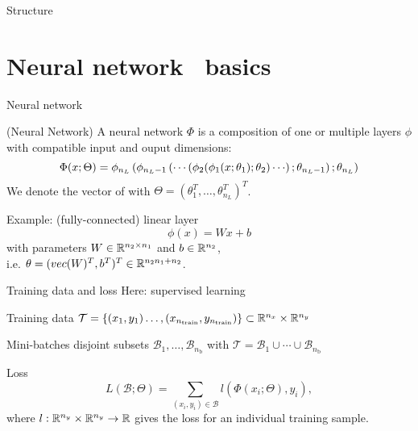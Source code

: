 \begin{frame}{Structure}
  \tableofcontents
\end{frame}

\section{Neural network ~\newline basics}

\begin{frame}{Neural network}
  \begin{definition}
    (Neural Network)
    A neural network $\Phi$ is a composition of one or multiple layers $\phi$ 
    with compatible input and ouput dimensions:
    \begin{equation*}
      \Phi(x;\Theta) = \phi_{n_L} \lb \phi_{n_L-1} \lb \cdots
      \lb \phi_2(
      \phi_1(x;\theta_1); \theta_2 ) \cdots \rb ; \theta_{n_L-1} \rb ; \theta_{n_L} \rb
    \end{equation*}
    We denote the vector of
     with $\Theta = (\theta_1^T, \dots, \theta_{n_L}^T)^T$.
  \end{definition}
  
  Example: (fully-connected) linear layer
  \begin{equation*}
    \phi(x) = Wx +b
  \end{equation*}
  with parameters $W \in \mathbb{R}^{n_2 \times n_1}$ 
  and $b \in \mathbb{R}^{n_2}$,\\
  i.e. $\theta = (vec(W)^T, b^T)^T \in \mathbb{R}^{n_2 n_1 + n_2}$.
\end{frame}

\begin{frame}{Training data and loss}
  Here: supervised learning

  \begin{block}{Training data}
    $\mathcal{T} = \{(x_1, y_1) \dots, (x_{n_{\text{train}}},y_{n_{\text{train}}}) \}
   \subset \mathbb{R}^{n_x} \times \mathbb{R}^{n_y}$
  \end{block}

  \begin{block}{Mini-batches}
    disjoint subsets $\mathcal{B}_1, \dots, \mathcal{B}_{n_{\text{b}}}$
    with $\mathcal{T} = \mathcal{B}_1 \cup \cdots \cup \mathcal{B}_{n_{\text{b}}}$
  \end{block}

  \begin{block}{Loss}
    \begin{equation*}
      L(\mathcal{B}; \Theta) = \sum_{(x_i,y_i) \in \mathcal{B}} l(\Phi(x_i; \Theta), y_i),
    \end{equation*}
    where $l : \mathbb{R}^{n_y} \times \mathbb{R}^{n_y} \to \mathbb{R}$ gives the loss for an 
    individual training sample.
  \end{block} 
\end{frame}

